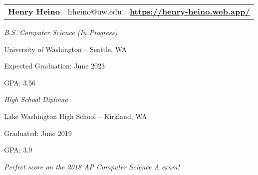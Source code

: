 \documentclass[12pt,letterpaper]{extarticle}
\begin{document}
  \setlength\parindent{0em}
  \begin{tabular}{lcr}
    {\huge \textbf{Henry Heino}} & hheino@uw.edu & {\large \textbf{\url{https://henry-heino.web.app/}}}
  \end{tabular}

  \qquad

  \emph{B.S. Computer Science (In Progress)}
  \begin{addmargin}[2em]{0em}
    \par University of Washington -- Seattle, WA
    \par Expected Graduation: June 2023
    \par GPA: 3.56
  \end{addmargin}

  \emph{High School Diploma}
  \begin{addmargin}[2em]{0em}
    \par Lake Washington High School -- Kirkland, WA
    \par Graduated: June 2019
    \par GPA: 3.9
    \par \emph{\footnotesize{Perfect score on the 2018 AP Computer Science A exam!}}
  \end{addmargin}
\end{document}
